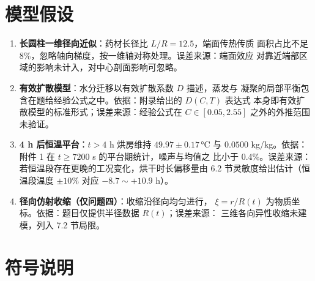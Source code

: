 \section{模型假设}

\begin{enumerate}
\item \textbf{长圆柱一维径向近似}：药材长径比 $L/R=12.5$，端面传热传质
面积占比不足 8\%，忽略轴向梯度，按一维轴对称处理。误差来源：端面效应
对靠近端部区域的影响未计入，对中心剖面影响可忽略\cite{bialobrzewski}。
\item \textbf{有效扩散模型}：水分迁移以有效扩散系数 $D$ 描述，蒸发与
凝聚的局部平衡包含在题给经验公式之中。依据：附录给出的 $D(C,T)$ 表达式
本身即有效扩散模型的标准形式\cite{luikov}；误差来源：经验公式在
$C\in[0.05,2.55]$ 之外的外推范围未验证。
\item \textbf{4 h 后恒温平台}：$t>4$ h 烘房维持 $49.97\pm0.17$\,°C 与
$0.0500$ kg/kg。依据：附件 1 在 $t\ge7200$ s 的平台期统计，噪声与均值之
比小于 0.4\%。误差来源：若恒温段存在更晚的工况变化，烘干时长偏移量由
6.2 节灵敏度给出估计（恒温段温度 $\pm10\%$ 对应 $-8.7\sim+10.9$ h）。
\item \textbf{径向仿射收缩（仅问题四）}：收缩沿径向均匀进行，
$\xi=r/R(t)$ 为物质坐标。依据：题目仅提供半径数据 $R(t)$；误差来源：
三维各向异性收缩未建模，列入 7.2 节局限。
\end{enumerate}

\section{符号说明}

